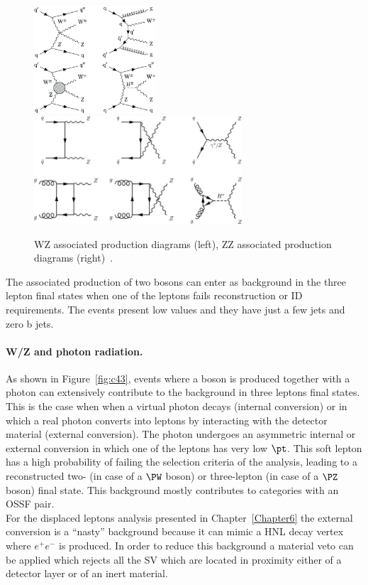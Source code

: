 \begin{figure}[h!]
\centering
  \includegraphics[height = 4cm]{Figures/c4/dia/WZjj-production.jpeg}
\hspace{1cm}
  \includegraphics[height = 4cm]{Figures/c4/dia/Lowest-order-Feynman-diagrams-for-ZZ-production.jpeg}
  \caption{WZ associated production diagrams (left), ZZ associated
    production diagrams (right)~\cite{diagram}.}
  \label{fig:c41}
\end{figure}
The associated production of two \PZ bosons can enter as background in
the three lepton final states when one of the leptons fails
reconstruction or ID requirements. The events present low \ptmiss
values and they have just a few jets and zero b jets. 


\paragraph{W/Z and photon radiation.}\label{sec:c4photon}
As shown in Figure~\ref{fig:c43}, events where a boson is produced
together with a photon can extensively contribute to the background in three leptons
final states. This is the case when when a virtual photon decays (internal conversion) or in which a real photon
converts into leptons by interacting with the detector material
(external conversion). The photon undergoes an
asymmetric internal or external conversion in which one of the leptons
has very low $\pt$. This soft lepton has a high probability of failing
the selection criteria of the analysis, leading to a reconstructed
two- (in case of a $\PW$ boson) or three-lepton (in case of a $\PZ$
boson) final state. This background mostly contributes to categories
with an OSSF pair.\\
For the displaced leptons analysis presented in Chapter~\ref{Chapter6}
the external conversion is a ``nasty'' background because it can mimic
a HNL decay vertex where $e^{+}e^{-}$ is produced. In order
to reduce this background a material veto can be applied which rejects all the SV
which are located in proximity either of a detector layer or of an inert material.

